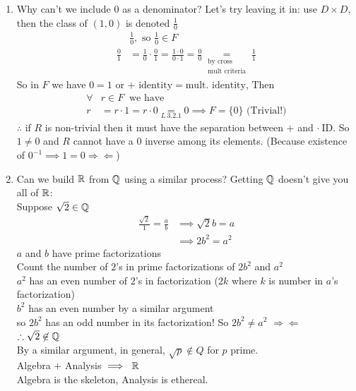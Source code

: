 \begin{enumerate}
    \item Why can't we include $0$ as a denominator? Let's try leaving it in: use $D\times D$, then the class of $(1,0)$ is denoted $\frac{1}{0}$
    \begin{align}
        &\frac{1}{0}, \text{ so }\frac{1}{0}\in F \nonumber \\
        \frac{0}{1} &= \frac{1}{0}\cdot \frac{0}{1} = \frac{1\cdot 0}{0\cdot 1} = \frac{0}{0} \underset{\substack{\text{by cross} \\ \text{mult criteria}}}{=}\frac{1}{1} \nonumber
    \end{align}
    So in $F$ we have $0=1$ or $+ \text{ identity}=\text{mult. identity}$, Then
    \begin{align}
        \forall &r \in F \ \text{ we have} \nonumber \\
        r &= r\cdot 1 = r\cdot 0 \underset{L \ 3.2.1}{=} 0 \implies F = \{0\} \text{ \ \ \  (Trivial!)} \nonumber
    \end{align}
    $\therefore$ if $R$ is non-trivial then it must have the separation between $+$ and $\cdot \ \text{ID}$. So $1\neq 0$ and $R$ cannot have a $0$ inverse among its elements. (Because existence of $0^{-1} \implies 1=0 \Rightarrow \Leftarrow$)
    \item Can we build ${\mathbb{ R}}$ from ${\mathbb{ Q}}$ using a similar process? Getting ${\mathbb{ Q}}$ doesn't give you all of ${\mathbb{ R}}$: \\ \steezybreak
    Suppose $\sqrt{2} \in {\mathbb{ Q}}$
    \begin{align}
        \frac{\sqrt{2}}{1}=\frac{a}{b} &\implies \sqrt{2}b=a \nonumber \\
        &\implies 2b^2 = a^2 \nonumber
    \end{align}
    $a$ and $b$ have prime factorizations \\
    Count the number of $2$'s in prime factorizations of $2b^2$ and $a^2$ \\
    $a^2$ has an even number of $2$'s in factorization ($2k$ where $k$ is number in $a$'s factorization) \\
    $b^2$ has an even number by a similar argument \\
    so $2b^2$ has an odd number in its factorization! So $2b^2 \neq a^2$ $\Rightarrow \Leftarrow$ \\
    $\therefore \sqrt{2} \not \in {\mathbb{ Q}}$ \\
    By a similar argument, in general, $\sqrt{p} \not \in Q$ for $p$ prime. \\
    Algebra $+$ Analysis $\implies \ {\mathbb{ R}} $ \\
    Algebra is the skeleton, Analysis is ethereal. 
\end{enumerate}

